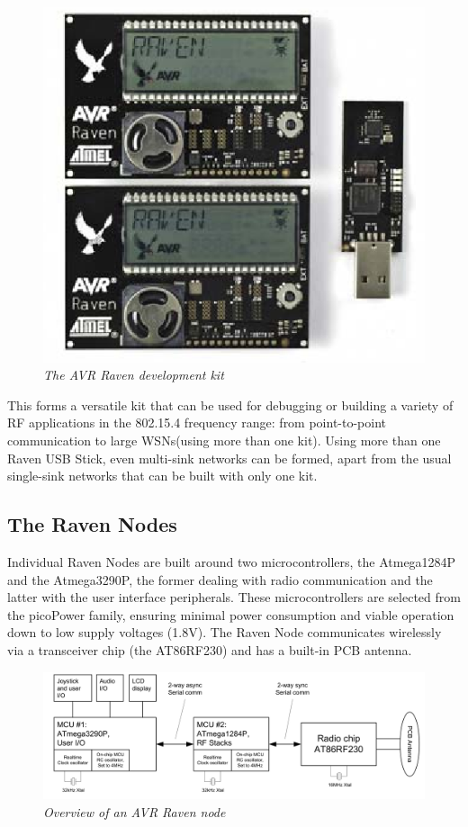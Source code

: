 \begin{figure}[ht]
\begin{center}
\includegraphics[scale=0.5]{hw_platform/raven.png}
\end{center}
\caption{\small \itshape{The AVR Raven development kit}}
\end{figure}

This forms a versatile kit that can be used for debugging or building a variety of RF applications in the 802.15.4 frequency range:
from point-to-point communication to large WSNs(using more than one kit). Using more than one Raven USB Stick, even multi-sink networks 
can be formed, apart from the usual single-sink networks that can be built with only one kit.

\subsection{The Raven Nodes}

Individual Raven Nodes are built around two microcontrollers, the Atmega1284P and the Atmega3290P, the former dealing with radio communication 
and the latter with the user interface peripherals. These microcontrollers are selected from the picoPower family, ensuring minimal power consumption
and viable operation down to low supply voltages (1.8V). The Raven Node communicates wirelessly via a transceiver chip (the AT86RF230) and has a 
built-in PCB antenna.

\begin{figure}[ht]
\begin{center}
\includegraphics[scale=0.9]{hw_platform/raven_node_overview.png}
\end{center}
\caption{\small \textit{Overview of an AVR Raven node}}
\end{figure}


